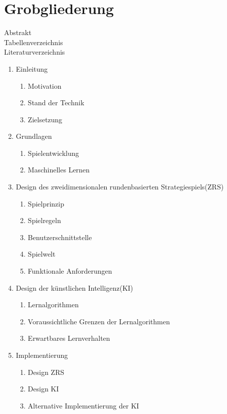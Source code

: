 \documentclass[12pt,a4paper]{scrartcl}
\begin{document}
\section*{Grobgliederung}
Abstrakt\\
Tabellenverzeichnis\\
Literaturverzeichnis
\begin{enumerate}
	\item Einleitung
	\begin{enumerate}
		\item Motivation
		\item Stand der Technik
		\item Zielsetzung
	\end{enumerate}
	
	\item Grundlagen
	\begin{enumerate}
		\item Spielentwicklung
		\item Maschinelles Lernen
	\end{enumerate}
	
	\item Design des zweidimensionalen rundenbasierten Strategiespiels(ZRS)
	\begin{enumerate}
		\item Spielprinzip
		\item Spielregeln
		\item Benutzerschnittstelle
		\item Spielwelt
		\item Funktionale Anforderungen
	\end{enumerate}
	
	\item Design der künstlichen Intelligenz(KI)
	\begin{enumerate}
		\item Lernalgorithmen
		\item Voraussichtliche Grenzen der Lernalgorithmen
		\item Erwartbares Lernverhalten
	\end{enumerate}		
	
	\item Implementierung
	\begin{enumerate}
		\item Design ZRS
		\item Design KI
		\item Alternative Implementierung der KI
	\end{enumerate}
	

\end{enumerate}
\end{document}

